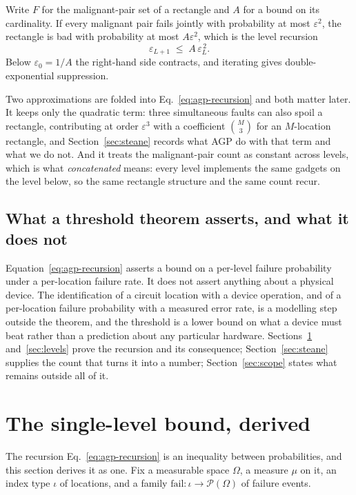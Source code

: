 \documentclass[aps,prx,reprint,nofootinbib,superscriptaddress]{revtex4-2}
\begin{document}
Write $F$ for the malignant-pair set of a rectangle and $A$ for a bound on its
cardinality. If every malignant pair fails jointly with probability at most
$\varepsilon^2$, the rectangle is bad with probability at most $A\varepsilon^2$,
which is the level recursion
\begin{equation}
  \varepsilon_{L+1} \;\le\; A\,\varepsilon_L^{\,2}.
  \label{eq:agp-recursion}
\end{equation}
Below $\varepsilon_0 = 1/A$ the right-hand side contracts, and iterating gives
double-exponential suppression.

Two approximations are folded into Eq.~\eqref{eq:agp-recursion} and both matter
later. It keeps only the quadratic term: three simultaneous faults can also
spoil a rectangle, contributing at order $\varepsilon^3$ with a coefficient
$\binom{M}{3}$ for an $M$-location rectangle, and Section~\ref{sec:steane}
records what AGP do with that term and what we do not. And it treats the
malignant-pair count as constant across levels, which is what
\emph{concatenated} means: every level implements the same gadgets on the level
below, so the same rectangle structure and the same count recur.

\subsection{What a threshold theorem asserts, and what it does not}

Equation~\eqref{eq:agp-recursion} asserts a bound on a per-level failure
probability under a per-location failure rate. It does not assert anything about
a physical device. The identification of a circuit location with a device
operation, and of a per-location failure probability with a measured error rate,
is a modelling step outside the theorem, and the threshold is a lower bound on
what a device must beat rather than a prediction about any particular hardware.
Sections~\ref{sec:single} and~\ref{sec:levels} prove the recursion and its
consequence; Section~\ref{sec:steane} supplies the count that turns it into a
number; Section~\ref{sec:scope} states what remains outside all of it.

\section{The single-level bound, derived}
\label{sec:single}

The recursion Eq.~\eqref{eq:agp-recursion} is an inequality between
probabilities, and this section derives it as one. Fix a measurable space
$\Omega$, a measure $\mu$ on it, an index type $\iota$ of locations, and a family
$\mathrm{fail} : \iota \to \mathcal{P}(\Omega)$ of failure events.
\end{document}
